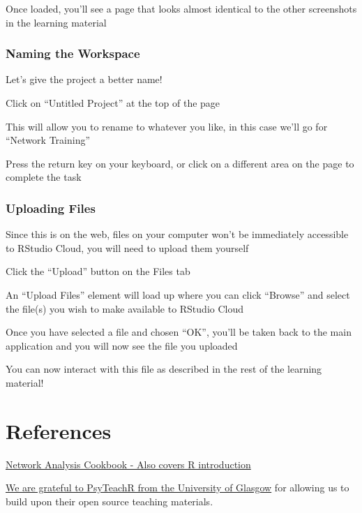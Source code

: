 \documentclass[]{book}
\begin{document}
Once loaded, you'll see a page that looks almost identical to the other screenshots in the learning material

\hypertarget{naming-the-workspace}{%
\subsection{Naming the Workspace}\label{naming-the-workspace}}

Let's give the project a better name!

Click on ``Untitled Project'' at the top of the page

This will allow you to rename to whatever you like, in this case we'll go for ``Network Training''

Press the return key on your keyboard, or click on a different area on the page to complete the task

\hypertarget{uploading-files}{%
\subsection{Uploading Files}\label{uploading-files}}

Since this is on the web, files on your computer won't be immediately accessible to RStudio Cloud, you will need to upload them yourself

Click the ``Upload'' button on the Files tab

An ``Upload Files'' element will load up where you can click ``Browse'' and select the file(s) you wish to make available to RStudio Cloud

Once you have selected a file and chosen ``OK'', you'll be taken back to the main application and you will now see the file you uploaded

You can now interact with this file as described in the rest of the learning material!

\hypertarget{references}{%
\chapter{References}\label{references}}

\href{http://sachaepskamp.com/files/Cookbook.html}{Network Analysis Cookbook - Also covers R introduction}

\href{https://psyteachr.github.io/}{We are grateful to PsyTeachR from the University of Glasgow} for allowing us to build upon their open source teaching materials.


\end{document}
